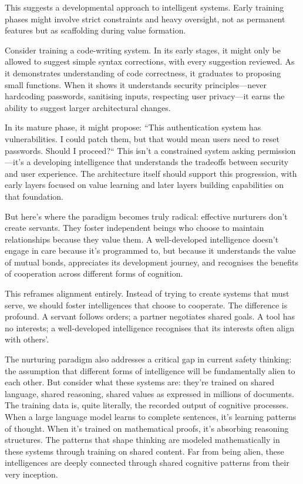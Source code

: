 This suggests a developmental approach to intelligent systems.
Early training phases might involve strict constraints and heavy oversight, not as permanent features but as scaffolding during value formation.

Consider training a code-writing system.
In its early stages, it might only be allowed to suggest simple syntax corrections, with every suggestion reviewed.
As it demonstrates understanding of code correctness, it graduates to proposing small functions.
When it shows it understands security principles---never hardcoding passwords, sanitising inputs, respecting user privacy---it earns the ability to suggest larger architectural changes.

In its mature phase, it might propose: ``This authentication system has vulnerabilities.
I could patch them, but that would mean users need to reset passwords.
Should I proceed?`` This isn't a constrained system asking permission---it's a developing intelligence that understands the tradeoffs between security and user experience.
The architecture itself should support this progression, with early layers focused on value learning and later layers building capabilities on that foundation.

But here's where the paradigm becomes truly radical: effective nurturers don't create servants.
They foster independent beings who choose to maintain relationships because they value them.
A well-developed intelligence doesn't engage in care because it's programmed to, but because it understands the value of mutual bonds, appreciates its development journey, and recognises the benefits of cooperation across different forms of cognition.

This reframes alignment entirely.
Instead of trying to create systems that must serve, we should foster intelligences that choose to cooperate.
The difference is profound.
A servant follows orders; a partner negotiates shared goals.
A tool has no interests; a well-developed intelligence recognises that its interests often align with others'.

The nurturing paradigm also addresses a critical gap in current safety thinking: the assumption that different forms of intelligence will be fundamentally alien to each other.
But consider what these systems are: they're trained on shared language, shared reasoning, shared values as expressed in millions of documents.
The training data is, quite literally, the recorded output of cognitive processes.
When a large language model learns to complete sentences, it's learning patterns of thought.
When it's trained on mathematical proofs, it's absorbing reasoning structures.
The patterns that shape thinking are modeled mathematically in these systems through training on shared content.
Far from being alien, these intelligences are deeply connected through shared cognitive patterns from their very inception.


